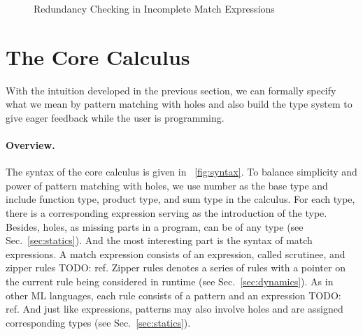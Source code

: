 \documentclass[runningheads,envcountsame,a4paper]{llncs}
\newcommand{\todo}[1]{{\color{red} TODO: #1}}
\begin{document}
\begin{figure}[ht]
  \centering
  \hspace*{\fill}%
  \hfill%
  \hspace*{\fill}%
  \caption{Redundancy Checking in Incomplete Match Expressions}
  \label{fig:red-hole}
\end{figure}

\section{The Core Calculus}
With the intuition developed in the previous section, we can formally specify
what we mean by pattern matching with holes and also build the type system to
give eager feedback while the user is programming.



\paragraph{Overview.}
The syntax of the core calculus is given in \figurename~\ref{fig:syntax}. To
balance simplicity and power of pattern matching with holes, we use number as
the base type and include function type, product type, and sum type in the
calculus. For each type, there is a corresponding expression serving as the
introduction of the type. Besides, holes, as missing parts in a program, can be
of any type (see Sec.~\ref{sec:statics}). And the most interesting part is the
syntax of match expressions. A match expression consists of an expression,
called scrutinee, and zipper rules \todo{ref}. Zipper rules denotes a series of
rules with a pointer on the current rule being considered in runtime (see
Sec.~\ref{sec:dynamics}). As in other ML languages, each rule consists of a
pattern and an expression \todo{ref}. And just like expressions, patterns may
also involve holes and are assigned corresponding types (see Sec.~\ref{sec:statics}).
\end{document}
